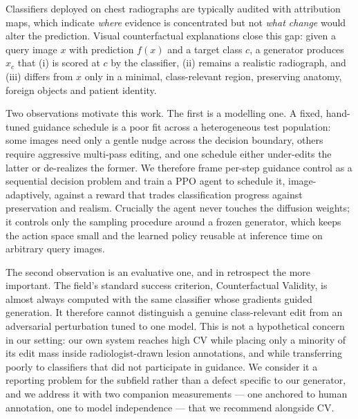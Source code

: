 \documentclass[10pt,twocolumn,letterpaper]{article}
\begin{document}
Classifiers deployed on chest radiographs are typically audited with
attribution maps, which indicate \emph{where} evidence is concentrated
but not \emph{what change} would alter the prediction. Visual
counterfactual explanations close this gap: given a query image $x$ with
prediction $f(x)$ and a target class $c$, a generator produces $x_c$ that
(i) is scored at $c$ by the classifier, (ii) remains a realistic
radiograph, and (iii) differs from $x$ only in a minimal, class-relevant
region, preserving anatomy, foreign objects and patient identity.

Two observations motivate this work. The first is a modelling one. A
fixed, hand-tuned guidance schedule is a poor fit across a heterogeneous
test population: some images need only a gentle nudge across the
decision boundary, others require aggressive multi-pass editing, and one
schedule either under-edits the latter or de-realizes the former. We
therefore frame per-step guidance control as a sequential decision
problem and train a PPO agent to schedule it, image-adaptively, against a
reward that trades classification progress against preservation and
realism. Crucially the agent never touches the diffusion weights; it
controls only the sampling procedure around a frozen generator, which
keeps the action space small and the learned policy reusable at
inference time on arbitrary query images.

The second observation is an evaluative one, and in retrospect the more
important. The field's standard success criterion, Counterfactual
Validity, is almost always computed with the same classifier whose
gradients guided generation. It therefore cannot distinguish a genuine
class-relevant edit from an adversarial perturbation tuned to one model.
This is not a hypothetical concern in our setting: our own system reaches
high CV while placing only a minority of its edit mass inside
radiologist-drawn lesion annotations, and while transferring poorly to
classifiers that did not participate in guidance. We consider it a
reporting problem for the subfield rather than a defect specific to our
generator, and we address it with two companion measurements --- one
anchored to human annotation, one to model independence --- that we
recommend alongside CV.
\end{document}
